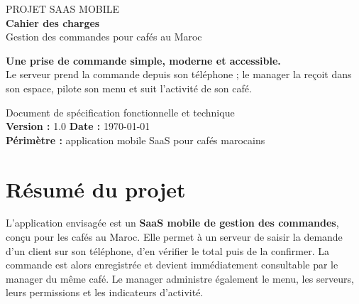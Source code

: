 \documentclass[11pt,a4paper]{article}
\begin{document}
\begin{titlepage}
  \thispagestyle{empty}
  \vspace*{2.0cm}
  {\sffamily\Large\textcolor{coffee}{PROJET SAAS MOBILE}}\\[0.55cm]
  {\sffamily\bfseries\fontsize{32}{37}\selectfont\textcolor{darkbrown}{Cahier des charges}}\\[0.25cm]
  {\sffamily\fontsize{19}{24}\selectfont\textcolor{coffee}{Gestion des commandes pour cafés au Maroc}}\\[1.35cm]
  \begin{summarybox}
    \sffamily\large\textcolor{coffee}{\textbf{Une prise de commande simple, moderne et accessible.}}\\[0.35cm]
    \normalsize Le serveur prend la commande depuis son téléphone ; le manager la reçoit dans son espace, pilote son menu et suit l’activité de son café.
  \end{summarybox}
  \vfill
  \begin{minipage}{0.63\textwidth}
    \sffamily\small
    \textcolor{muted}{Document de spécification fonctionnelle et technique}\\[0.25cm]
    \textbf{Version :} 1.0 \hspace{1.3cm} \textbf{Date :} \today\\[0.15cm]
    \textbf{Périmètre :} application mobile SaaS pour cafés marocains
  \end{minipage}
\end{titlepage}

\setcounter{page}{1}
\tableofcontents
\clearpage
{}
\setcounter{page}{1}

\section{Résumé du projet}
\begin{summarybox}
L’application envisagée est un \textbf{SaaS mobile de gestion des commandes}, conçu pour les cafés au Maroc. Elle permet à un serveur de saisir la demande d’un client sur son téléphone, d’en vérifier le total puis de la confirmer. La commande est alors enregistrée et devient immédiatement consultable par le manager du même café. Le manager administre également le menu, les serveurs, leurs permissions et les indicateurs d’activité.
\end{summarybox}
\end{document}

